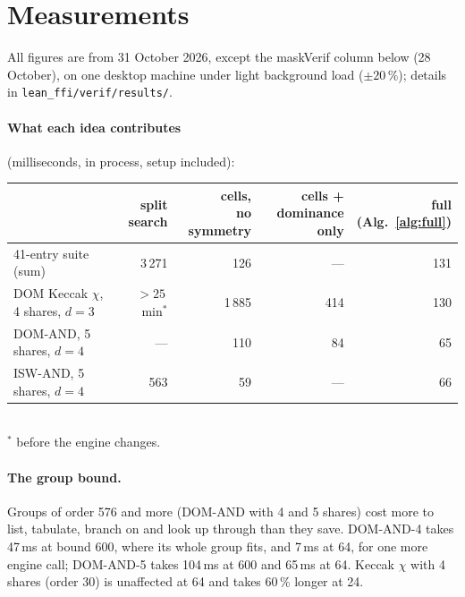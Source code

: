 \documentclass[11pt,a4paper]{article}
\theoremstyle{definition}
\theoremstyle{remark}
\newcommand{\code}[1]{\texttt{\small #1}}
\begin{document}
\section{Measurements}\label{sec:measure}

All figures are from 31 October 2026, except the maskVerif column below (28 October), on one
desktop machine under light background load ($\pm 20\,\%$); details in
\code{lean\_ffi/verif/results/}.

\paragraph{What each idea contributes} (milliseconds, in process, setup included):
\begin{center}\small
\begin{tabular}{@{}lrrrr@{}}
\toprule
 & \shortstack{split\\search} & \shortstack{cells,\\no symmetry} & \shortstack{cells +\\dominance only} & \shortstack{full\\(Alg.~\ref{alg:full})}\\
\midrule
41-entry suite (sum) & 3\,271 & 126 & --- & 131\\
DOM Keccak $\chi$, 4 shares, $d=3$ & $>25$\,min$^\ast$ & 1\,885 & 414 & 130\\
DOM-AND, 5 shares, $d=4$ & --- & 110 & 84 & 65\\
ISW-AND, 5 shares, $d=4$ & 563 & 59 & --- & 66\\
\bottomrule
\end{tabular}\\[2pt]
{\footnotesize $^\ast$ before the engine changes.}
\end{center}

\paragraph{The group bound.}  Groups of order 576 and more (DOM-AND with 4 and 5 shares)
cost more to list, tabulate, branch on and look up through than they save.  DOM-AND-4 takes
47\,ms at bound 600, where its whole group fits, and 7\,ms at 64, for one more engine call;
DOM-AND-5 takes 104\,ms at 600 and 65\,ms at 64.  Keccak $\chi$ with 4 shares (order 30) is
unaffected at 64 and takes 60\,\% longer at 24.
\end{document}

